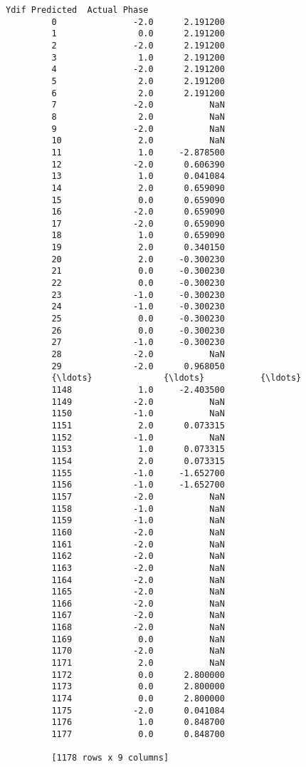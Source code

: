 \documentclass[11pt]{article}
\begin{document}
\begin{Verbatim}[commandchars=\\\{\}]
               Ydif Predicted  Actual Phase  
         0               -2.0      2.191200  
         1                0.0      2.191200  
         2               -2.0      2.191200  
         3                1.0      2.191200  
         4               -2.0      2.191200  
         5                2.0      2.191200  
         6                2.0      2.191200  
         7               -2.0           NaN  
         8                2.0           NaN  
         9               -2.0           NaN  
         10               2.0           NaN  
         11               1.0     -2.878500  
         12              -2.0      0.606390  
         13               1.0      0.041084  
         14               2.0      0.659090  
         15               0.0      0.659090  
         16              -2.0      0.659090  
         17              -2.0      0.659090  
         18               1.0      0.659090  
         19               2.0      0.340150  
         20               2.0     -0.300230  
         21               0.0     -0.300230  
         22               0.0     -0.300230  
         23              -1.0     -0.300230  
         24              -1.0     -0.300230  
         25               0.0     -0.300230  
         26               0.0     -0.300230  
         27              -1.0     -0.300230  
         28              -2.0           NaN  
         29              -2.0      0.968050  
         {\ldots}              {\ldots}           {\ldots}  
         1148             1.0     -2.403500  
         1149            -2.0           NaN  
         1150            -1.0           NaN  
         1151             2.0      0.073315  
         1152            -1.0           NaN  
         1153             1.0      0.073315  
         1154             2.0      0.073315  
         1155            -1.0     -1.652700  
         1156            -1.0     -1.652700  
         1157            -2.0           NaN  
         1158            -1.0           NaN  
         1159            -1.0           NaN  
         1160            -2.0           NaN  
         1161            -2.0           NaN  
         1162            -2.0           NaN  
         1163            -2.0           NaN  
         1164            -2.0           NaN  
         1165            -2.0           NaN  
         1166            -2.0           NaN  
         1167            -2.0           NaN  
         1168            -2.0           NaN  
         1169             0.0           NaN  
         1170            -2.0           NaN  
         1171             2.0           NaN  
         1172             0.0      2.800000  
         1173             0.0      2.800000  
         1174             0.0      2.800000  
         1175            -2.0      0.041084  
         1176             1.0      0.848700  
         1177             0.0      0.848700  
         
         [1178 rows x 9 columns]
\end{Verbatim}
            
\end{document}
